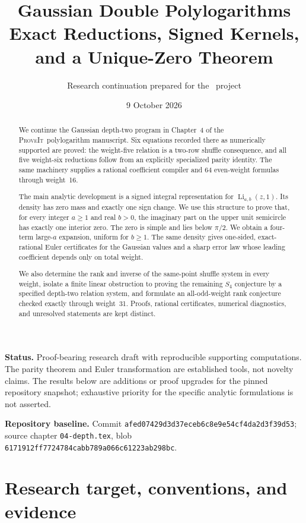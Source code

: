 \documentclass[11pt,a4paper]{article}
\title{\vspace{-12mm}\textbf{Gaussian Double Polylogarithms}\\[4pt]\Large Exact Reductions, Signed Kernels,\\and a Unique-Zero Theorem}
\author{Research continuation prepared for the \repo\ project}
\date{9 October 2026}
\numberwithin{equation}{section}
\theoremstyle{definition}
\theoremstyle{remark}
\newcommand{\Li}{\operatorname{Li}}
\newcommand{\repo}{\textsc{ProveIt}}
\begin{document}
\maketitle
\begin{abstract}
We continue the Gaussian depth-two program in Chapter~4 of the \repo\ polylogarithm manuscript. Six equations recorded there as numerically supported are proved: the weight-five relation is a two-row shuffle consequence, and all five weight-six reductions follow from an explicitly specialized parity identity. The same machinery supplies a rational coefficient compiler and 64 even-weight formulas through weight~16.

The main analytic development is a signed integral representation for
$\Li_{a,b}(z,1)$. Its density has zero mass and exactly one sign change. We use this structure to prove that, for every integer $a\ge1$ and real $b>0$, the imaginary part on the upper unit semicircle has exactly one interior zero. The zero is simple and lies below $\pi/2$. We obtain a four-term large-$a$ expansion, uniform for $b\ge1$. The same density gives one-sided, exact-rational Euler certificates for the Gaussian values and a sharp error law whose leading coefficient depends only on total weight.

We also determine the rank and inverse of the same-point shuffle system in every weight, isolate a finite linear obstruction to proving the remaining $S_4$ conjecture by a specified depth-two relation system, and formulate an all-odd-weight rank conjecture checked exactly through weight~31. Proofs, rational certificates, numerical diagnostics, and unresolved statements are kept distinct.
\end{abstract}
\vspace{5pt}
\noindent\textbf{Status.} Proof-bearing research draft with reproducible supporting computations. The parity theorem and Euler transformation are established tools, not novelty claims. The results below are additions or proof upgrades for the pinned repository snapshot; exhaustive priority for the specific analytic formulations is not asserted.

\noindent\textbf{Repository baseline.} Commit
\texttt{afed07429d3d37eceb6c8e9e54cf4da2d3f39d53}; source chapter
\texttt{04-depth.tex}, blob \texttt{6171912ff7724784cabb789a066c61223ab298bc}.
\newpage
\begingroup
\small
\setlength{\parskip}{0pt}
\tableofcontents
\endgroup
\newpage

\section{Research target, conventions, and evidence}
\label{sec:scope}
\end{document}
